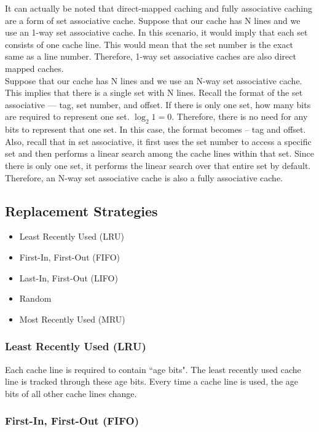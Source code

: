 \documentclass[11pt]{article}
\begin{document}
It can actually be noted that direct-mapped caching and fully associative caching are a form of set associative cache. Suppose that our cache has N lines and we use an 1-way set associative cache. In this scenario, it would imply that each set consists of one cache line. This would mean that the set number is the exact same as a line number. Therefore, 1-way set associative caches are also direct mapped caches.\\

\noindent Suppose that our cache has N lines and we use an N-way set associative cache. This implies that there is a single set with N lines. Recall the format of the set associative --- tag, set number, and offset. If there is only one set, how many bits are required to represent one set. \( \log_2 1 = 0 \). Therefore, there is no need for any bits to represent that one set. In this case, the format becomes -- tag and offset. Also, recall that in set associative, it first uses the set number to access a specific set and then performs a linear search among the cache lines within that set. Since there is only one set, it performs the linear search over that entire set by default. Therefore, an N-way set associative cache is also a fully associative cache.

\subsection{Replacement Strategies}

\begin{itemize}
	\item Least Recently Used (LRU)
 	\item First-In, First-Out (FIFO)
 	\item Last-In, First-Out (LIFO)
 	\item Random
 	\item Most Recently Used (MRU)
\end{itemize}

\subsubsection{Least Recently Used (LRU)}

Each cache line is required to contain ``age bits". The least recently used cache line is tracked through these age bits. Every time a cache line is used, the age bits of all other cache lines change.

\subsubsection{First-In, First-Out (FIFO)}
\end{document}
